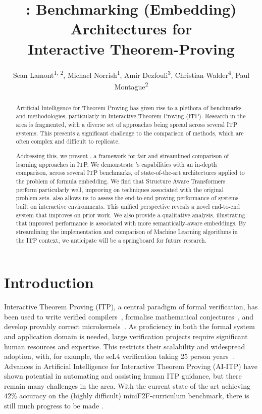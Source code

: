 \documentclass[letterpaper]{article} %
\title{\sysname{}: Benchmarking (Embedding) Architectures for\\Interactive Theorem-Proving}
\author{
    Sean Lamont\textsuperscript{\rm 1, 2},
    Michael Norrish\textsuperscript{\rm 1},
    Amir Dezfouli\textsuperscript{\rm 3},
    Christian Walder\textsuperscript{\rm 4},
    Paul Montague\textsuperscript{\rm 2}
}
\newcommand{\sysname}{\textsc{\sffamily{Bait}}}
\begin{document}
    \maketitle



    \begin{abstract}
        Artificial Intelligence for Theorem Proving has given rise to a plethora of benchmarks and
        methodologies, particularly in Interactive Theorem Proving (ITP).
        Research in the area is fragmented, with a diverse set of approaches being spread across several ITP systems.
        This presents a significant challenge to the comparison of methods, which are often complex and difficult to replicate.

        Addressing this, we present \sysname{},
        a framework for fair and streamlined
        comparison of learning approaches in ITP.
        We demonstrate \sysname{}'s capabilities with an in-depth comparison, across several ITP benchmarks, of state-of-the-art architectures applied to the problem of formula embedding.
        We find that Structure Aware Transformers perform particularly well, improving on techniques associated with the original problem sets.
        \sysname{} also allows us to assess the end-to-end proving performance of systems built on interactive environments.
        This unified perspective reveals a novel end-to-end system that improves on prior work.
        We also provide a qualitative analysis, illustrating that improved
        performance is associated with more semantically-aware embeddings.
        By streamlining the implementation and comparison of Machine Learning algorithms in the ITP context, we anticipate \sysname{} will be a springboard for future
        research.
    \end{abstract}


    \section{Introduction}
    Interactive Theorem Proving (ITP), a central paradigm of formal verification,
    has been used to write verified compilers~\cite{leroy_compcert_2014, tan_verified_2019},
    formalise mathematical conjectures~\cite{gonthier_four_2008}, and develop provably correct microkernels~\cite{klein_sel4_2009}.
    As proficiency in both the formal system and application domain is needed,
    large verification projects require significant human resources and expertise.
    This restricts their scalability and widespread adoption, with, for example, the seL4 verification taking 25 person years~\cite{klein_sel4_2009}.
    Advances in Artificial Intelligence for Interactive Theorem Proving (AI-ITP) have shown potential in automating
    and assisting human ITP guidance, but there remain many challenges in the area.
    With the current state of the art achieving $42\%$ accuracy on the (highly difficult) miniF2F-curriculum benchmark, there is still much progress to be made \cite{lample_hypertree_2022, zheng_minif2f_2021}.
\end{document}
